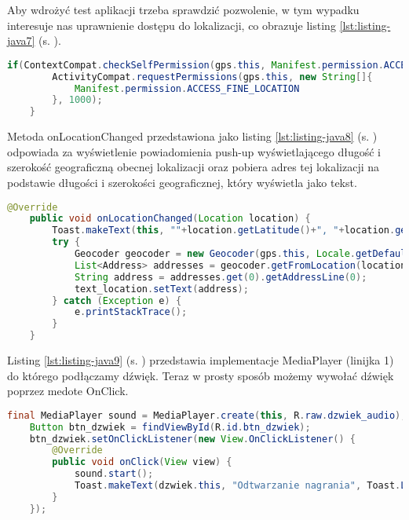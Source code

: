 Aby wdrożyć test aplikacji trzeba sprawdzić pozwolenie, w tym wypadku interesuje nas uprawnienie dostępu do lokalizacji, co obrazuje listing  \ref{lst:listing-java7} (s. \pageref{lst:listing-java7}). 
\begin{lstlisting}[caption=GPS - Dostęp do lokazlizacji, label={lst:listing-java7}, language=Java]
	if(ContextCompat.checkSelfPermission(gps.this, Manifest.permission.ACCESS_FINE_LOCATION) != PackageManager.PERMISSION_GRANTED) {
		ActivityCompat.requestPermissions(gps.this, new String[]{
			Manifest.permission.ACCESS_FINE_LOCATION
		}, 1000);
	}
\end{lstlisting}

\newpage


Metoda onLocationChanged przedstawiona jako listing \ref{lst:listing-java8} (s. \pageref{lst:listing-java8}) odpowiada za wyświetlenie powiadomienia push-up wyświetlającego długość i szerokość geograficzną obecnej lokalizacji oraz pobiera adres tej lokalizacji na podstawie długości i szerokości geograficznej, który wyświetla jako tekst.
\begin{lstlisting}[caption=GPS - Wyświetlanie lokalizacji, label={lst:listing-java8}, language=Java]
	@Override
	public void onLocationChanged(Location location) {
		Toast.makeText(this, ""+location.getLatitude()+", "+location.getLongitude(), Toast.LENGTH_SHORT).show();
		try {
			Geocoder geocoder = new Geocoder(gps.this, Locale.getDefault());
			List<Address> addresses = geocoder.getFromLocation(location.getLatitude(), location.getLongitude(), 1);
			String address = addresses.get(0).getAddressLine(0);
			text_location.setText(address);
		} catch (Exception e) {
			e.printStackTrace();
		}
	}
\end{lstlisting}


Listing \ref{lst:listing-java9} (s. \pageref{lst:listing-java9}) przedstawia implementacje MediaPlayer (linijka 1) do którego podłączamy dźwięk. Teraz w prosty sposób możemy wywołać dźwięk poprzez medote OnClick.
\begin{lstlisting}[caption= Dźwięk - Działanie z wykorzystaniem MediaPlayer, label={lst:listing-java9}, language=Java]
	final MediaPlayer sound = MediaPlayer.create(this, R.raw.dzwiek_audio);
	Button btn_dzwiek = findViewById(R.id.btn_dzwiek);
	btn_dzwiek.setOnClickListener(new View.OnClickListener() {
		@Override
		public void onClick(View view) {
			sound.start();
			Toast.makeText(dzwiek.this, "Odtwarzanie nagrania", Toast.LENGTH_SHORT).show();
		}
	});
\end{lstlisting}

